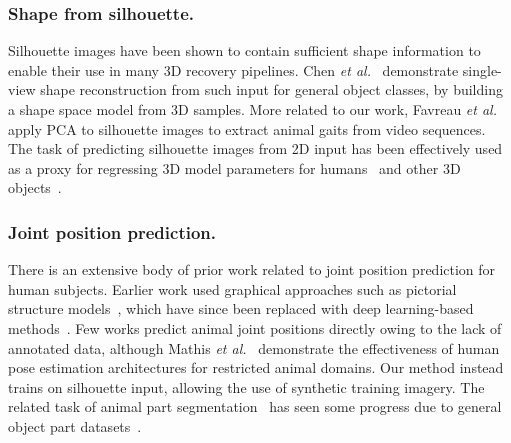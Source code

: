   \subsubsection*{Shape from silhouette.} Silhouette images have been shown to contain sufficient shape information to enable their use in many 3D recovery pipelines. Chen {\em et al.}~\cite{chen2010inferring} demonstrate single-view shape reconstruction from such input for general object classes, by building a shape space model from 3D samples. More related to our work, Favreau {\em et al.}~\cite{favreau2004animal} apply PCA to silhouette images to extract animal gaits from video sequences. The task of predicting silhouette images from 2D input has been effectively used as a proxy for regressing 3D model parameters for humans~\cite{indirect2017,hmrKanazawa17} and other 3D objects~\cite{wiles2017silnet}.
  
  \subsubsection*{Joint position prediction.} There is an extensive body of prior work related to joint position prediction for human subjects. Earlier work used graphical approaches such as pictorial structure models~\cite{andriluka2010monocular,pishchulin2013poselet,johnson2010clustered}, which have since been replaced with deep learning-based methods~\cite{cao2017realtime,bulat2016human}. Few works predict animal joint positions directly owing to the lack of annotated data, although Mathis {\em et al.}~\cite{mathis2018deeplabcut} demonstrate the effectiveness of human pose estimation architectures for restricted animal domains. Our method instead trains on silhouette input, allowing the use of synthetic training imagery. The related task of animal part segmentation~\cite{wang2015joint,wang2015semantic} has seen some progress due to general object part datasets~\cite{chen_cvpr14,zhou2017scene}.
  
